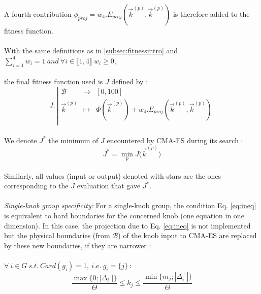 A fourth contribution $\phi_{proj}=w_{4}.E_{proj}(\underline{\vec{k}}^{(p)},\vec{k}^{(p)})$ is therefore added to the fitness function.\\
\\
With the same definitions as in \ref{subsec:fitnessintro} and\\
$\sum_{i=1}^{4} w_{i}=1\ and\ \forall i\in\llbracket 1,4\rrbracket\ w_{i}\geq 0$,\\
\\
the final fitness function used is $J$ defined by :\\
\begin{equation*}
		J:
		\left|
  		\begin{array}{rcl}
    	\mathscr{B} & \longrightarrow &[0,100] \\
    	\underline{\vec{k}}^{(p)} & \longmapsto &  \Phi(\vec{k}^{(p)})+w_{4}.E_{proj}(\underline{\vec{k}}^{(p)},\vec{k}^{(p)}) \\
  	\end{array}
	\right.
\end{equation*}
\\
We denote $J^{*}$ the minimum of $J$ encountered by CMA-ES during its search :
\begin{equation*}
	J^{*}=\min_{p}{J({\vec{k}^{(p)})}}
\end{equation*}
\\
Similarly, all values (input or output) denoted with stars are the ones corresponding to the $J$ evaluation that gave $J^{*}$.\\
\\
\emph{Single-knob group specificity:} For a single-knob group, the condition Eq. \ref{eq:ineq} is equivalent to hard boundaries for the concerned knob (one equation in one dimension). In this case, the projection due to Eq. \ref{eq:ineq} is not implemented but the physical boundaries (from $\mathscr{B}$) of the knob input to CMA-ES are replaced by these new boundaries, if they are narrower :\\
\\
$\forall\ i\in G\ s.t.\ Card(g_{i})=1,\ i.e.\ g_{i}=\{j\}\ :$
\begin{equation}
	\frac{\max{\big\{0;|\Delta_{i}^{-}|\big\}}}{\Theta}\leq k_{j} \leq \frac{\min{\big\{m_{j};|\Delta_{i}^{+}|\big\}}}{\Theta}
\end{equation}
